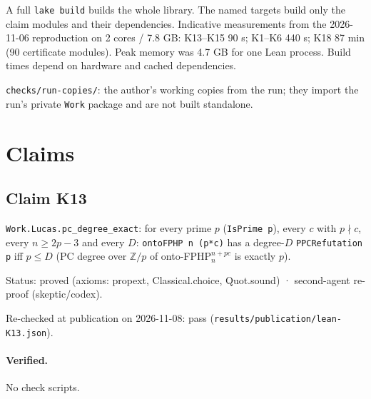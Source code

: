 \documentclass{article}
\begin{document}
A full \texttt{lake build} builds the whole library. The named targets build only the claim modules and their dependencies. Indicative measurements from the 2026-11-06 reproduction on 2 cores / 7.8 GB: K13--K15 90 s; K1--K6 440 s; K18 87 min (90 certificate modules). Peak memory was 4.7 GB for one Lean process. Build times depend on hardware and cached dependencies.

\texttt{checks/run-copies/}: the author's working copies from the run; they import the run's private \texttt{Work} package and are not built standalone.

\section{Claims}

\subsection*{Claim K13}

\texttt{Work.Lucas.pc\_degree\_exact}: for every prime $p$ (\texttt{IsPrime p}), every $c$ with $p\nmid c$, every $n\ge2p-3$ and every $D$: \texttt{ontoFPHP n (p*c)} has a degree-$D$ \texttt{PPCRefutation p} iff $p\le D$ (PC degree over $\mathbb Z/p$ of onto-FPHP$^{n+pc}_n$ is exactly $p$).

Status: proved (axioms: propext, Classical.choice, Quot.sound) · second-agent re-proof (skeptic/codex).

Re-checked at publication on 2026-11-08: pass (\texttt{results/publication/lean-K13.json}).

\paragraph{Verified.}
No check scripts.
\end{document}
